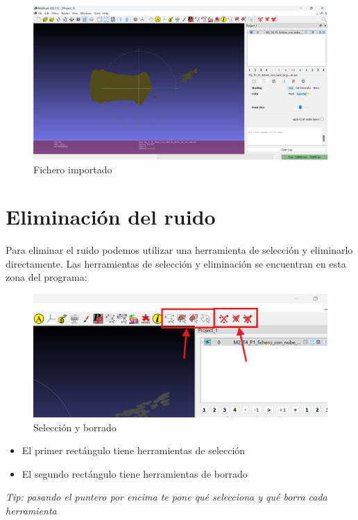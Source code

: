 \documentclass{article}
\begin{document}
\begin{figure}[H]
    \centering
    \includegraphics[scale=0.34]{images/importar_02.png}
    \caption{Fichero importado}
\end{figure}

\section{Eliminación del ruido}

Para eliminar el ruido podemos utilizar una herramienta de selección y eliminarlo directamente. Las herramientas de selección y eliminación se encuentran en esta zona del programa:

\begin{figure}[H]
    \centering
    \includegraphics[scale=0.55]{images/ruido_01.png}
    \caption{Selección y borrado}
\end{figure}

\begin{itemize}
    \item El primer rectángulo tiene herramientas de selección
    \item El segundo rectángulo tiene herramientas de borrado
\end{itemize}

\textit{Tip: pasando el puntero por encima te pone qué selecciona y qué borra cada herramienta}
\end{document}
